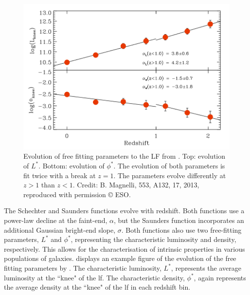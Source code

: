\begin{figure}[ht!]
    \centering
    \includegraphics[width=0.95\linewidth]{Figures/magnelli_param.png}
    \caption{Evolution of free fitting parameters to the LF from \cite{magnelli_deepest_2013}. Top: evolution of $L^*$. Bottom: evolution of $\phi^*$. The evolution of both parameters is fit twice with a break at $z=1$. The parameters evolve differently at $z>1$ than $z<1$. Credit: B. Magnelli, 553, A132, 17, 2013, reproduced with permission © ESO.}
    \label{Fig: Example Magnelli Param}
\end{figure}

The Schechter \citep{schechter_analytic_1976} and Saunders \citep{saunders_60-mum_1990} functions evolve with redshift. Both functions use a power-law decline at the faint-end, $\alpha$, but the Saunders function incorporates an additional Gaussian bright-end slope, $\sigma$. Both functions also use two free-fitting parameters, $L^{*}$ and $\phi^{*}$, representing the characteristic luminosity and density, respectively. This allows for the characterisation of intrinsic properties in various populations of galaxies.  displays an example figure of the evolution of the free fitting parameters by \cite{magnelli_deepest_2013}. The characteristic luminosity, $L^{*}$, represents the average luminosity at the ``knee" of the \gls{lf}. The characteristic density, $\phi^{*}$, again represents the average density at the ``knee" of the \gls{lf} in each redshift bin.

